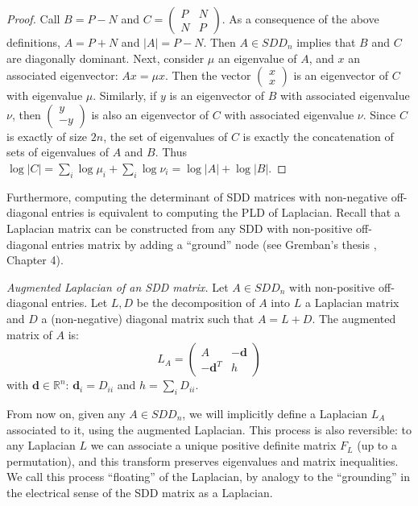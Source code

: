 \begin{proof} Call $B=P-N$ and $C=\left(\begin{array}{cc}
P & N\\
N & P
\end{array}\right)$. As a consequence of the above definitions, $A=P+N$ and $\left|A\right| = P - N$. Then $A \in SDD_{n}$ implies that $B$ and $C$ are diagonally dominant. Next, consider $\mu$ an eigenvalue of $A$, and $x$ an associated eigenvector:
$Ax=\mu x$. Then the vector $\left(\begin{array}{c}
x\\
x
\end{array}\right)$
is an eigenvector of $C$ with eigenvalue $\mu$. Similarly, if $y$ is an eigenvector of $B$ with associated eigenvalue $\nu$, then $\left(\begin{array}{c}
y\\
-y
\end{array}\right)$ is also an eigenvector of $C$ with associated eigenvalue $\nu$. Since $C$ is exactly of size $2n$, the set of eigenvalues of $C$
is exactly the concatenation of sets of eigenvalues of $A$ and $B$.
Thus $\log\left|C\right|=\sum_{i}\log\mu_{i}+\sum_{i}\log\nu_{i}=\log\left|A\right|+\log\left|B\right|$.
\end{proof}

Furthermore, computing the determinant of SDD matrices with non-negative
off-diagonal entries is equivalent to computing the PLD of Laplacian.
Recall that a Laplacian matrix can be constructed from any SDD with
non-positive off-diagonal entries matrix by adding a ``ground''
node (see Gremban's thesis \cite{Gremban1996}, Chapter 4).

\begin{definition} \emph{Augmented Laplacian of an SDD matrix.} Let
$A\in SDD_{n}$ with non-positive off-diagonal entries. Let $L,D$ be the decomposition of $A$ into $L$
a Laplacian matrix and $D$ a (non-negative) diagonal matrix such
that $A=L+D$. The augmented matrix of $A$ is: 
\[
L_{A}=\left(\begin{array}{cc}
A & -\mathbf{d}\\
-\mathbf{d}^{T} & h
\end{array}\right)
\]
with $\mathbf{d}\in\mathbb{R}^{n}$: $\mathbf{d}_{i}=D_{ii}$ and
$h=\sum_{i}D_{ii}$. \end{definition}

From now on, given any $A\in SDD_{n}$, we will implicitly define
a Laplacian $L_{A}$ associated to it, using the augmented Laplacian.
This process is also reversible: to any Laplacian $L$ we can associate
a unique positive definite matrix $F_{L}$ (up to a permutation),
and this transform preserves eigenvalues and matrix inequalities.
We call this process ``floating'' of the Laplacian, by analogy to
the ``grounding'' in the electrical sense of the SDD matrix as a
Laplacian.


